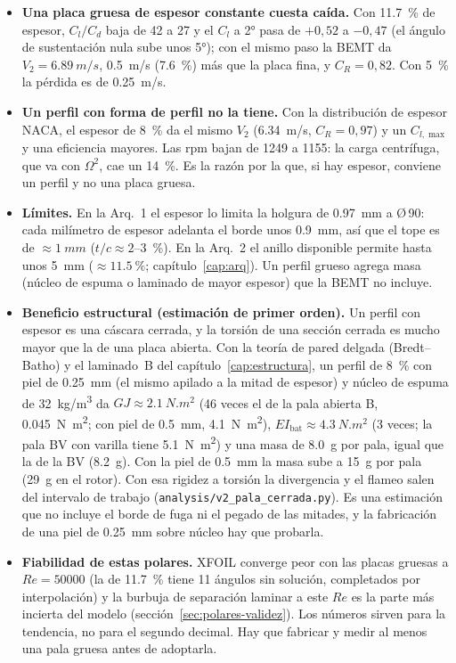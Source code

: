 \begin{itemize}[leftmargin=*]
  \item \textbf{Una placa gruesa de espesor constante cuesta caída.} Con \SI{11.7}{\percent} de espesor, $C_l/C_d$ baja de 42 a 27 y el $C_l$ a \ang{2}
        pasa de $+0{,}52$ a $-0{,}47$ (el ángulo de sustentación nula sube unos \ang{5}); con el mismo paso la BEMT da $V_2=\SI{6.89}{m/s}$, \SI{0.5}{m/s} (\SI{7.6}{\percent}) más
        que la placa fina, y $C_R=0{,}82$. Con \SI{5}{\percent} la pérdida es de \SI{0.25}{m/s}.
  \item \textbf{Un perfil con forma de perfil no la tiene.} Con la distribución de espesor NACA, el espesor de \SI{8}{\percent} da el mismo $V_2$ (\SI{6.34}{m/s},
        $C_R=0{,}97$) y un $C_{l,\max}$ y una eficiencia mayores. Las rpm bajan de 1249 a 1155: la carga centrífuga, que va con $\Omega^2$, cae un
        \SI{14}{\percent}. Es la razón por la que, si hay espesor, conviene un perfil y no una placa gruesa.
  \item \textbf{Límites.} En la Arq.~1 el espesor lo limita la holgura de \SI{0.97}{mm} a Ø\,90: cada milímetro de espesor adelanta el borde unos \SI{0.9}{mm}, así que
        el tope es de $\approx\SI{1}{mm}$ ($t/c\approx2$--\SI{3}{\percent}). En la Arq.~2 el anillo disponible permite hasta unos \SI{5}{mm} ($\approx\SI{11.5}{\percent}$;
        capítulo~\ref{cap:arq}). Un perfil grueso agrega masa (núcleo de espuma o laminado de mayor espesor) que la BEMT no incluye.
  \item \textbf{Beneficio estructural (estimación de primer orden).} Un perfil con espesor es una cáscara cerrada, y la torsión de una sección cerrada es
        mucho mayor que la de una placa abierta. Con la teoría de pared delgada (Bredt--Batho) y el laminado~B del capítulo~\ref{cap:estructura}, un perfil de
        \SI{8}{\percent} con piel de \SI{0.25}{mm} (el mismo apilado a la mitad de espesor) y núcleo de espuma de \SI{32}{kg/m^3} da $GJ\approx\SI{2.1}{N.m^2}$
        (46 veces el de la pala abierta B, \SI{0.045}{N.m^2}; con piel de \SI{0.5}{mm}, \SI{4.1}{N.m^2}), $EI_{\text{bat}}\approx\SI{4.3}{N.m^2}$
        (3 veces; la pala BV con varilla tiene \SI{5.1}{N.m^2}) y una masa de \SI{8.0}{g} por pala, igual que la de la BV (\SI{8.2}{g}). Con la piel de \SI{0.5}{mm} la masa
        sube a \SI{15}{g} por pala (\SI{+29}{g} en el rotor). Con esa rigidez a torsión la divergencia y el flameo salen del intervalo de
        trabajo (\texttt{analysis/v2\_pala\_cerrada.py}). Es una estimación que no incluye el borde de fuga ni el pegado de las mitades, y la fabricación de una piel de
        \SI{0.25}{mm} sobre núcleo hay que probarla.
  \item \textbf{Fiabilidad de estas polares.} XFOIL converge peor con las placas gruesas a $Re=\num{50000}$ (la de \SI{11.7}{\percent} tiene 11 ángulos sin solución,
        completados por interpolación) y la burbuja de separación laminar a este $Re$ es la parte más incierta del modelo (sección~\ref{sec:polares-validez}). Los números sirven para
        la tendencia, no para el segundo decimal. Hay que fabricar y medir al menos una pala gruesa antes de adoptarla.
\end{itemize}
